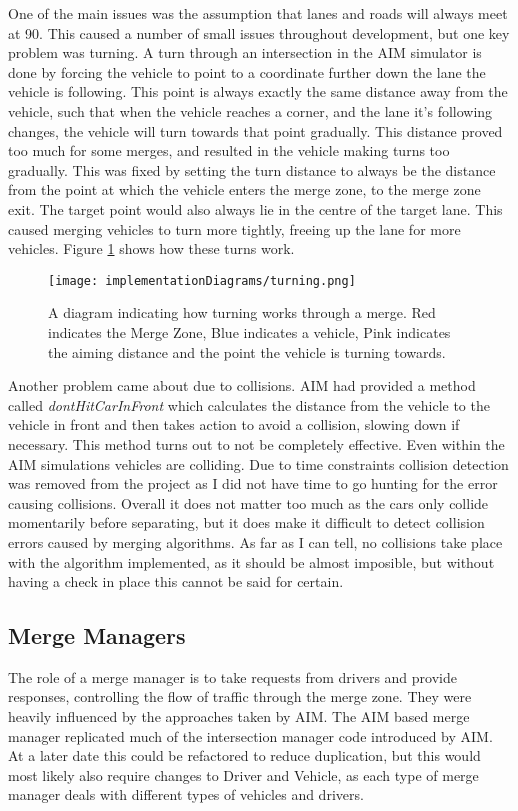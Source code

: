 One of the main issues was the assumption that lanes and roads will always meet at 90\degree. This caused a number of small issues throughout development, but one key problem was turning. A turn through an intersection in the AIM simulator is done by forcing the vehicle to point to a coordinate further down the lane the vehicle is following. This point is always exactly the same distance away from the vehicle, such that when the vehicle reaches a corner, and the lane it's following changes, the vehicle will turn towards that point gradually. This distance proved too much for some merges, and resulted in the vehicle making turns too gradually. This was fixed by setting the turn distance to always be the distance from the point at which the vehicle enters the merge zone, to the merge zone exit. The target point would also always lie in the centre of the target lane. This caused merging vehicles to turn more tightly, freeing up the lane for more vehicles. Figure \ref{fig:turning} shows how these turns work.

\begin{figure}[htb]
\texttt{[image: implementationDiagrams/turning.png]}
\caption{A diagram indicating how turning works through a merge. Red indicates the Merge Zone, Blue indicates a vehicle, Pink indicates the aiming distance and the point the vehicle is turning towards.}
\label{fig:turning}
\end{figure}

Another problem came about due to collisions. AIM had provided a method called \emph{dontHitCarInFront} which calculates the distance from the vehicle to the vehicle in front and then takes action to avoid a collision, slowing down if necessary. This method turns out to not be completely effective. Even within the AIM simulations vehicles are colliding. Due to time constraints collision detection was removed from the project as I did not have time to go hunting for the error causing collisions. Overall it does not matter too much as the cars only collide momentarily before separating, but it does make it difficult to detect collision errors caused by merging algorithms. As far as I can tell, no collisions take place with the algorithm implemented, as it should be almost imposible, but without having a check in place this cannot be said for certain.

\subsection{Merge Managers}
\label{subsec:Merge Managers}
The role of a merge manager is to take requests from drivers and provide responses, controlling the flow of traffic through the merge zone. They were heavily influenced by the approaches taken by AIM. The AIM based merge manager replicated much of the intersection manager code introduced by AIM. At a later date this could be refactored to reduce duplication, but this would most likely also require changes to Driver and Vehicle, as each type of merge manager deals with different types of vehicles and drivers.

